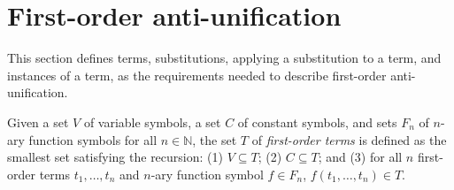 \section{First-order anti-unification}   \label{AU}

This section defines terms, substitutions, applying a substitution to a term, and instances of a term, as the requirements needed to describe first-order anti-unification.

\begin{defn}\label{def:term}
Given a set $V$ of variable symbols, a set $C$ of constant symbols, and sets $F_n$ of $n$-ary function symbols for all $n\in\mathbb{N}$, the set $T$ of \emph{first-order terms} is defined as the smallest set satisfying the recursion: (1) $V\subseteq T$; (2) $C\subseteq T$; and (3) for all $n$ first-order terms $t_1, \ldots, t_n$ and $n$-ary function symbol $f\in F_n$,  $f(t_1, \ldots, t_n) \in T$.
\end{defn}

